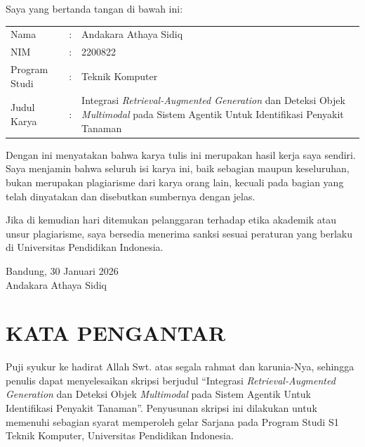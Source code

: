 \documentclass[12pt, a4paper, oneside]{report}
\newcommand{\authorname}{Andakara Athaya Sidiq}
\newcommand{\studentid}{2200822}
\newcommand{\thesisyear}{2026}
\begin{document}
\noindent Saya yang bertanda tangan di bawah ini: \par
\noindent
\begin{tabular}{@{}l p{0.2cm} l}
    Nama & : & \authorname \\
    NIM & : & \studentid \\
    Program Studi & : & Teknik Komputer \\
    Judul Karya & : & \parbox[t]{11cm}{Integrasi \textit{Retrieval-Augmented Generation} dan Deteksi Objek \textit{Multimodal} pada Sistem Agentik Untuk Identifikasi Penyakit Tanaman}
\end{tabular}
\vspace{\baselineskip}
\begin{center}
Dengan ini menyatakan bahwa karya tulis ini merupakan hasil kerja saya sendiri. Saya menjamin bahwa seluruh isi karya ini, baik sebagian maupun keseluruhan, bukan merupakan plagiarisme dari karya orang lain, kecuali pada bagian yang telah dinyatakan dan disebutkan sumbernya dengan jelas. \par
\vspace{\baselineskip}
Jika di kemudian hari ditemukan pelanggaran terhadap etika akademik atau unsur plagiarisme, saya bersedia menerima sanksi sesuai peraturan yang berlaku di Universitas Pendidikan Indonesia.\par
\end{center}

\vfill
\begin{center}
    Bandung, 30 Januari \thesisyear \\
    \vspace{2.5cm}
    \authorname
\end{center}
\vspace{1.5cm}
\clearpage

\chapter*{KATA PENGANTAR}

Puji syukur ke hadirat Allah Swt. atas segala rahmat dan karunia-Nya, sehingga penulis dapat menyelesaikan skripsi berjudul “Integrasi \textit{Retrieval-Augmented Generation} dan Deteksi Objek \textit{Multimodal} pada Sistem Agentik Untuk Identifikasi Penyakit Tanaman”. Penyusunan skripsi ini dilakukan untuk memenuhi sebagian syarat memperoleh gelar Sarjana pada Program Studi S1 Teknik Komputer, Universitas Pendidikan Indonesia.
\end{document}
